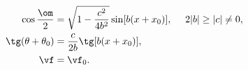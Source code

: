 \begin{equation*}
\begin{split}
  \cos\frac\om2&=\sqrt{1-\frac{c^2}{4b^2}}\sin[b(x+x_0)],~~~~2|b|\ge|c|\ne0,
\\
  \tg(\theta+\theta_0)&=\frac c{2b}\tg[b(x+x_0)],
\\
  \vf&=\vf_0.
\end{split}
\end{equation*}

